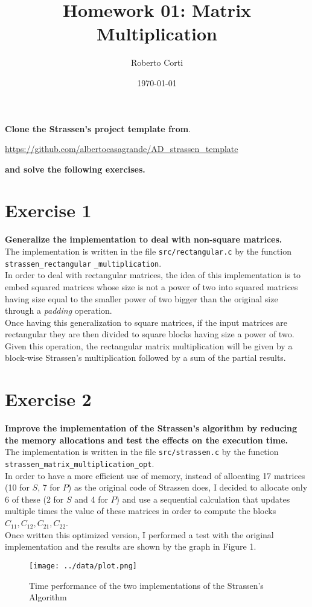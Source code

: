 \documentclass{article}
\title{Homework 01: Matrix Multiplication}
\date{\today}
\author{Roberto Corti}
\begin{document}
	\maketitle
	
	
	\noindent \textbf{Clone the Strassen’s project template from}. 
	\begin{center}
		\url{https://github.com/albertocasagrande/AD_strassen_template} 	
	\end{center}
	\textbf{and solve the following exercises.}
	
	
	\section*{Exercise 1}
	\textbf{Generalize the implementation to deal with non-square matrices.}\\
	
	\noindent The implementation is written in the file \texttt{src/rectangular.c} by the function \texttt{strassen\_rectangular} \texttt{\_multiplication}.
	\\
	
	\noindent In order to deal with rectangular matrices, the idea of this implementation is to embed squared matrices whose size is not a power of two into squared matrices having size equal to the smaller power of two bigger than the original size through a \textit{padding} operation.\\
	Once having this generalization to square matrices, if the input matrices are rectangular they are then divided to square blocks having size a power of two. Given this operation, the rectangular matrix multiplication will be given by a block-wise Strassen's multiplication followed by a sum of the partial results.
	
	\section*{Exercise 2}
	\textbf{Improve the implementation of the Strassen’s algorithm by reducing the memory allocations and test the effects on the execution time.}\\
	
	\noindent The implementation is written in the file \texttt{src/strassen.c} by the function \texttt{strassen\_matrix\_multiplication\_opt}.
	\\
	
	\noindent In order to have a more efficient use of memory, instead of allocating 17 matrices (10 for $S$, 7 for $P$) as the original code of Strassen does, I decided to allocate only 6 of these (2 for $S$ and 4 for $P$) and use a sequential calculation that updates multiple times the value of these matrices in order to compute the blocks $C_{11}, C_{12}, C_{21}, C_{22}$. \\
	Once written this optimized version, I performed a test with the original implementation and the results are shown by the graph in Figure 1.

	\begin{figure}[h]
		\begin{center}
			\texttt{[image: ../data/plot.png]}
			\label{plot}
			\caption{Time performance of the two implementations of the Strassen's Algorithm}
		\end{center}
	\end{figure}	
	
	
\end{document}
